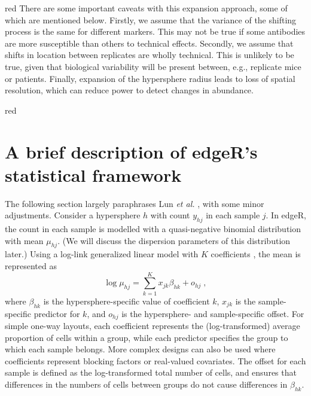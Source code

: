 \documentclass{article}
\begin{document}
\begin{color}{red}
There are some important caveats with this expansion approach, some of which are mentioned below.
Firstly, we assume that the variance of the shifting process is the same for different markers.
This may not be true if some antibodies are more susceptible than others to technical effects.
Secondly, we assume that shifts in location between replicates are wholly technical.
This is unlikely to be true, given that biological variability will be present between, e.g., replicate mice or patients.
Finally, expansion of the hypersphere radius leads to loss of spatial resolution, which can reduce power to detect changes in abundance.

\end{color}


\begin{color}{red}
\section{A brief description of edgeR's statistical framework}
The following section largely paraphrases Lun \textit{et al.} \cite{lun2016delicious}, with some minor adjustments.
Consider a hypersphere $h$ with count $y_{hj}$ in each sample $j$.
In edgeR, the count in each sample is modelled with a quasi-negative binomial distribution with mean $\mu_{hj}$.
(We will discuss the dispersion parameters of this distribution later.)
Using a log-link generalized linear model with $K$ coefficients \cite{mccarthy2012differential}, the mean is represented as
\[
    \log \mu_{hj} = \sum_{k=1}^K x_{jk} \beta_{hk} + o_{hj} \;,
\]
where $\beta_{hk}$ is the hypersphere-specific value of coefficient $k$, $x_{jk}$ is the sample-specific predictor for $k$, and $o_{hj}$ is the hypersphere- and sample-specific offset.
For simple one-way layouts, each coefficient represents the (log-transformed) average proportion of cells within a group, while each predictor specifies the group to which each sample belongs.
More complex designs can also be used where coefficients represent blocking factors or real-valued covariates.
The offset for each sample is defined as the log-transformed total number of cells, and ensures that differences in the numbers of cells between groups do not cause differences in $\beta_{hk}$.


\end{color}
\end{document}
